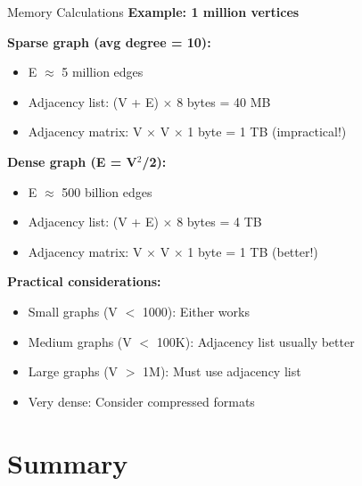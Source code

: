 \documentclass[aspectratio=169]{beamer}
\begin{document}
\begin{frame}{Memory Calculations}
  \textbf{Example: 1 million vertices}

  \vspace{0.3cm}
  \textbf{Sparse graph (avg degree = 10):}
  \begin{itemize}
    \item E $\approx$ 5 million edges
    \item Adjacency list: (V + E) $\times$ 8 bytes = 40 MB
    \item Adjacency matrix: V $\times$ V $\times$ 1 byte = 1 TB (impractical!)
  \end{itemize}

  \vspace{0.3cm}
  \textbf{Dense graph (E = V$^2$/2):}
  \begin{itemize}
    \item E $\approx$ 500 billion edges
    \item Adjacency list: (V + E) $\times$ 8 bytes = 4 TB
    \item Adjacency matrix: V $\times$ V $\times$ 1 byte = 1 TB (better!)
  \end{itemize}

  \vspace{0.3cm}
  \textbf{Practical considerations:}
  \begin{itemize}
    \item Small graphs (V $<$ 1000): Either works
    \item Medium graphs (V $<$ 100K): Adjacency list usually better
    \item Large graphs (V $>$ 1M): Must use adjacency list
    \item Very dense: Consider compressed formats
  \end{itemize}
\end{frame}

\section{Summary}
\end{document}
